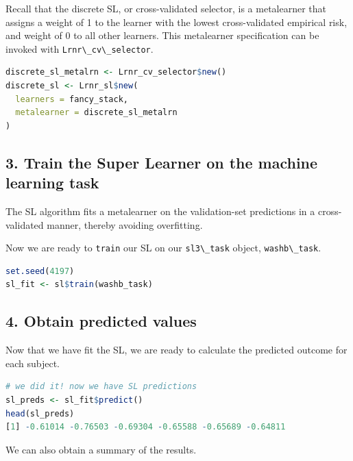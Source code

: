 \documentclass[
  12pt, krantz2,
]{book}
\newcommand{\passthrough}[1]{#1}
\theoremstyle{definition}
\theoremstyle{definition}
\theoremstyle{definition}
\newcommand{\1}{\mathbbm{1}}
\begin{document}
Recall that the discrete SL, or cross-validated selector, is a metalearner that
assigns a weight of 1 to the learner with the lowest cross-validated empirical
risk, and weight of 0 to all other learners. This metalearner specification can
be invoked with \passthrough{\lstinline!Lrnr\_cv\_selector!}.

\begin{lstlisting}[language=R]
discrete_sl_metalrn <- Lrnr_cv_selector$new()
discrete_sl <- Lrnr_sl$new(
  learners = fancy_stack,
  metalearner = discrete_sl_metalrn
)
\end{lstlisting}

\hypertarget{train-the-super-learner-on-the-machine-learning-task}{%
\subsection*{3. Train the Super Learner on the machine learning task}\label{train-the-super-learner-on-the-machine-learning-task}}


The SL algorithm fits a metalearner on the validation-set predictions in a
cross-validated manner, thereby avoiding overfitting.

Now we are ready to \passthrough{\lstinline!train!} our SL on our \passthrough{\lstinline!sl3\_task!} object, \passthrough{\lstinline!washb\_task!}.

\begin{lstlisting}[language=R]
set.seed(4197)
sl_fit <- sl$train(washb_task)
\end{lstlisting}

\hypertarget{obtain-predicted-values}{%
\subsection*{4. Obtain predicted values}\label{obtain-predicted-values}}


Now that we have fit the SL, we are ready to calculate the predicted outcome
for each subject.

\begin{lstlisting}[language=R]
# we did it! now we have SL predictions
sl_preds <- sl_fit$predict()
head(sl_preds)
[1] -0.61014 -0.76503 -0.69304 -0.65588 -0.65689 -0.64811
\end{lstlisting}

We can also obtain a summary of the results.
\end{document}
